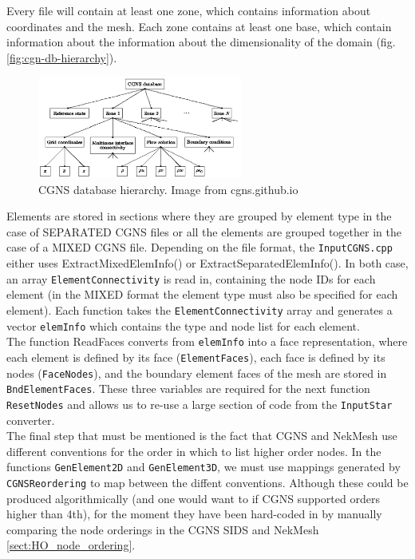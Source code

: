 {Every file will contain at least one zone, which contains information
about coordinates and the mesh. Each zone contains at least one base,
which contain information about the information about the
dimensionality of the domain (fig. \ref{fig:cgn-db-hierarchy}).

\begin{figure}[h]
 \centering
  \includegraphics[width=0.6\textwidth]{img/CGNS_database_hierarchy.png}
  \caption{CGNS database hierarchy. Image from cgns.github.io}
  \label{fig:cgns-db-hierarchy}
\end{figure}

Elements are stored in sections where they are grouped by element type
in the case of SEPARATED CGNS files or all the elements are grouped
together in the case of a MIXED CGNS file. Depending on the file
format, the \texttt{InputCGNS.cpp} either uses ExtractMixedElemInfo()
or ExtractSeparatedElemInfo(). In both case, an array
\texttt{ElementConnectivity} is read in, containing the node IDs for
each element (in the MIXED format the element type must also be
specified for each element). Each function takes the
\texttt{ElementConnectivity} array and generates a vector
\texttt{elemInfo} which contains the type and node list for each
element.\\

The function ReadFaces converts from \texttt{elemInfo} into a face
representation, where each element is defined by its face
(\texttt{ElementFaces}), each face is defined by its nodes
(\texttt{FaceNodes}), and the boundary element faces of the mesh are
stored in \texttt{BndElementFaces}. These three variables are required
for the next function \texttt{ResetNodes} and allows us to re-use a
large section of code from the \texttt{InputStar} converter. \\

The final step that must be mentioned is the fact that CGNS and
NekMesh use different conventions for the order in which to list
higher order nodes. In the functions \texttt{GenElement2D} and
\texttt{GenElement3D}, we must use mappings generated by
\texttt{CGNSReordering} to map between the diffent
conventions. Although these could be produced algorithmically (and one
would want to if CGNS supported orders higher than 4th), for the
moment they have been hard-coded in by manually comparing the node
orderings in the CGNS SIDS \cite{SIDS_node_ordering} and NekMesh
\ref{sect:HO_node_ordering}.

}
